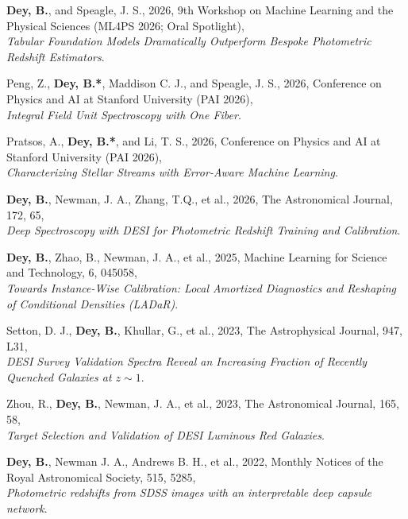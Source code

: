    \item \textbf{Dey, B.}, and Speagle, J. S., 2026, 9th Workshop on Machine Learning and the Physical Sciences (ML4PS 2026; Oral Spotlight),\\ \textit{Tabular Foundation Models Dramatically Outperform Bespoke Photometric Redshift Estimators}.
   
   \item Peng, Z.\dagger, \textbf{Dey, B.*}, Maddison C. J., and Speagle, J. S., 2026, Conference on Physics and AI at Stanford University (PAI 2026),\\ \textit{Integral Field Unit Spectroscopy with One Fiber}.
   
   \item Pratsos, A.\dagger, \textbf{Dey, B.*}, and Li, T. S., 2026, Conference on Physics and AI at Stanford University (PAI 2026),\\ \textit{Characterizing Stellar Streams with Error-Aware Machine Learning}.
   
   \item \textbf{Dey, B.}, Newman, J. A., Zhang, T.Q., et al., 2026, The Astronomical Journal, 172, 65, \\
    \textrm{\textit{Deep Spectroscopy with DESI for Photometric Redshift Training and Calibration}}. %
    
    
    \item  \textbf{Dey, B.}, Zhao, B., Newman, J. A., et al., 2025, Machine Learning for Science and Technology, 6, 045058,\\ \textit{Towards Instance-Wise Calibration: Local Amortized Diagnostics and Reshaping of Conditional Densities (LADaR)}. 

   
    
    \item Setton, D. J., \textbf{Dey, B.}, Khullar, G., et al., 2023, The Astrophysical Journal, 947, L31, \\ \textit{DESI Survey Validation Spectra Reveal an Increasing Fraction of Recently Quenched Galaxies at $z\sim1$}.
    
    \item Zhou, R., \textbf{Dey, B.}, Newman, J. A., et al., 2023, The Astronomical Journal, 165, 58, \\ \textit{Target Selection and Validation of DESI Luminous Red Galaxies}.
    
    \item  \textbf{Dey, B.}, Newman J. A., Andrews B. H., et al., 2022, Monthly Notices of the Royal Astronomical Society, 515, 5285, \\ \textit{Photometric redshifts from SDSS images with an interpretable deep capsule network}. 

